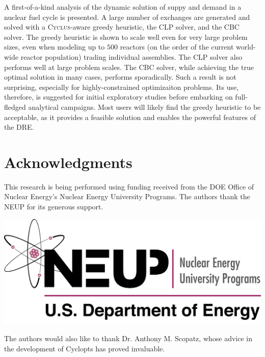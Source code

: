 \documentclass{anstrans}
\newcommand{\Cyclus}{\textsc{Cyclus}}
\begin{document}
A first-of-a-kind analysis of the dynamic solution of suppy and demand in a
nuclear fuel cycle is presented. A large number of exchanges are generated and
solved with a \Cyclus-aware greedy heuristic, the CLP solver, and the CBC
solver. The greedy heuristic is shown to scale well even for very large problem
sizes, even when modeling up to $500$ reactors (on the order of the current
world-wide reactor population) trading individual assemblies. The CLP solver
also performs well at large problem scales. The CBC solver, while achieving the
true optimal solution in many cases, performs sporadically. Such a result is not
surprising, especially for highly-constrained optimizaiton problems. Its use,
therefore, is suggested for initial exploratory studies before embarking on
full-fledged analytical campaigns. Most users will likely find the greedy
heuristic to be acceptable, as it provides a feasible solution and enables the
powerful features of the DRE.


\section{Acknowledgments}

This research is being performed using funding received from the DOE
Office of Nuclear Energy's Nuclear Energy University Programs.  The
authors thank the NEUP for its generous support.

\begin{center}
\includegraphics[width=.25\columnwidth]{neup_logo_large.jpg}
\end{center}

The authors would also like to thank Dr. Anthony M. Scopatz, whose advice in the
development of Cyclopts has proved invaluable.



\end{document}
